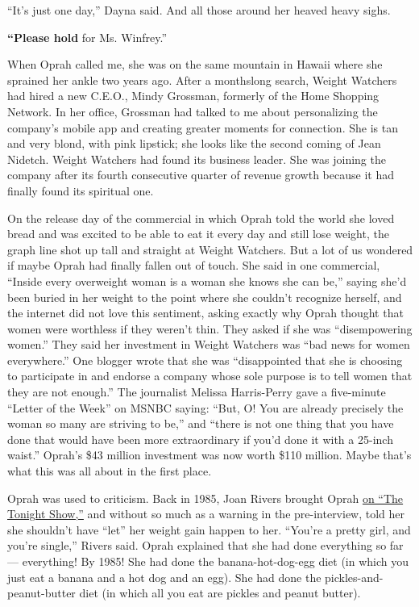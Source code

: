 ``It's just one day,'' Dayna said. And all those around her heaved heavy
sighs.

\textbf{``Please hold} for Ms. Winfrey.''

When Oprah called me, she was on the same mountain in Hawaii where she
sprained her ankle two years ago. After a monthslong search, Weight
Watchers had hired a new C.E.O., Mindy Grossman, formerly of the Home
Shopping Network. In her office, Grossman had talked to me about
personalizing the company's mobile app and creating greater moments for
connection. She is tan and very blond, with pink lipstick; she looks
like the second coming of Jean Nidetch. Weight Watchers had found its
business leader. She was joining the company after its fourth
consecutive quarter of revenue growth because it had finally found its
spiritual one.

On the release day of the commercial in which Oprah told the world she
loved bread and was excited to be able to eat it every day and still
lose weight, the graph line shot up tall and straight at Weight
Watchers. But a lot of us wondered if maybe Oprah had finally fallen out
of touch. She said in one commercial, ``Inside every overweight woman is
a woman she knows she can be,'' saying she'd been buried in her weight
to the point where she couldn't recognize herself, and the internet did
not love this sentiment, asking exactly why Oprah thought that women
were worthless if they weren't thin. They asked if she was
``disempowering women.'' They said her investment in Weight Watchers was
``bad news for women everywhere.'' One blogger wrote that she was
``disappointed that she is choosing to participate in and endorse a
company whose sole purpose is to tell women that they are not enough.''
The journalist Melissa Harris-Perry gave a five-minute ``Letter of the
Week'' on MSNBC saying: ``But, O! You are already precisely the woman so
many are striving to be,'' and ``there is not one thing that you have
done that would have been more extraordinary if you'd done it with a
25-inch waist.'' Oprah's \$43 million investment was now worth \$110
million. Maybe that's what this was all about in the first place.

Oprah was used to criticism. Back in 1985, Joan Rivers brought Oprah
\href{https://www.youtube.com/watch?v=TAtjDjZa2eA}{on ``The Tonight
Show,''} and without so much as a warning in the pre-interview, told her
she shouldn't have ``let'' her weight gain happen to her. ``You're a
pretty girl, and you're single,'' Rivers said. Oprah explained that she
had done everything so far --- everything! By 1985! She had done the
banana-hot-dog-egg diet (in which you just eat a banana and a hot dog
and an egg). She had done the pickles-and-peanut-butter diet (in which
all you eat are pickles and peanut butter).

